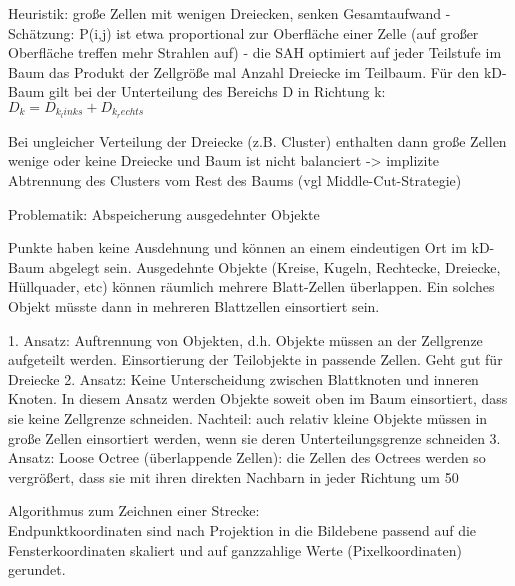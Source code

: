 \documentclass[10pt,landscape]{article}
\makeatletter
\renewcommand{\section}{\@startsection{section}{1}{0mm}%
                                {-1ex plus -.5ex minus -.2ex}%
                                {0.5ex plus .2ex}%
                                {\normalfont\large\bfseries}}
\renewcommand{\subsection}{\@startsection{subsection}{2}{0mm}%
                                {-1explus -.5ex minus -.2ex}%
                                {0.5ex plus .2ex}%
                                {\normalfont\normalsize\bfseries}}
\makeatother
\begin{document}
\begin{multicols}{3}
Heuristik: große Zellen mit wenigen Dreiecken, senken Gesamtaufwand
- Schätzung: P(i,j) ist etwa proportional zur Oberfläche einer Zelle (auf großer Oberfläche treffen mehr Strahlen auf)
- die SAH optimiert auf jeder Teilstufe im Baum das Produkt der Zellgröße mal Anzahl Dreiecke im Teilbaum. Für den kD-Baum gilt bei der Unterteilung des Bereichs D in Richtung k: $D_k = D_{k_links} + D_{k_rechts}$

Bei ungleicher Verteilung der Dreiecke (z.B. Cluster) enthalten dann große Zellen wenige oder keine Dreiecke und Baum ist nicht balanciert -> implizite Abtrennung des Clusters vom Rest des Baums (vgl Middle-Cut-Strategie)

Problematik: Abspeicherung ausgedehnter Objekte

Punkte haben keine Ausdehnung und können an einem eindeutigen Ort im kD-Baum abgelegt sein. Ausgedehnte Objekte (Kreise, Kugeln, Rechtecke, Dreiecke, Hüllquader, etc) können räumlich mehrere Blatt-Zellen überlappen. Ein solches Objekt müsste dann in mehreren Blattzellen einsortiert sein.

1. Ansatz: Auftrennung von Objekten, d.h. Objekte müssen an der Zellgrenze aufgeteilt werden. Einsortierung der Teilobjekte in passende Zellen. Geht gut für Dreiecke
2. Ansatz: Keine Unterscheidung zwischen Blattknoten und inneren Knoten. In diesem Ansatz werden Objekte soweit oben im Baum einsortiert, dass sie keine Zellgrenze schneiden. Nachteil: auch relativ kleine Objekte müssen in große Zellen einsortiert werden, wenn sie deren Unterteilungsgrenze schneiden
3. Ansatz: Loose Octree (überlappende Zellen): die Zellen des Octrees werden so vergrößert, dass sie mit ihren direkten Nachbarn in jeder Richtung um 50%

Algorithmus zum Zeichnen einer Strecke:\\
Endpunktkoordinaten sind nach Projektion in die Bildebene passend auf die Fensterkoordinaten skaliert und auf ganzzahlige Werte (Pixelkoordinaten) gerundet.


\end{multicols}
\end{document}
